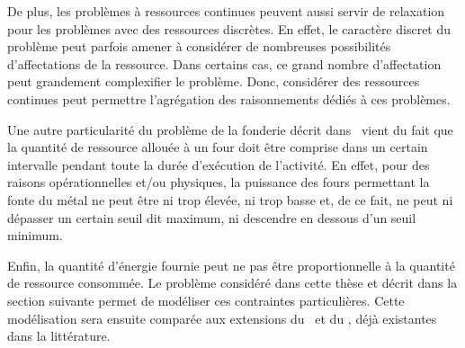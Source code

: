 De plus, les problèmes à ressources continues peuvent aussi servir de
relaxation pour les problèmes avec des ressources discrètes. En effet,
le caractère discret du problème peut parfois amener à considérer de
nombreuses possibilités d'affectations de la ressource. Dans certains
cas, ce grand nombre d'affectation peut grandement complexifier le
problème. Donc, considérer des ressources continues peut permettre
l'agrégation des raisonnements dédiés à ces problèmes.

Une autre particularité du problème de la fonderie décrit
dans~\cite{HaitArtiguesLopez} vient du fait que la quantité de
ressource allouée à un four doit être comprise dans un certain
intervalle pendant toute la durée d'exécution de l'activité.  En
effet, pour des raisons opérationnelles et/ou physiques, la puissance
des fours permettant la fonte du métal ne peut être ni trop élevée, ni
trop basse et, de ce fait, ne peut ni dépasser un certain seuil dit
maximum, ni descendre en dessous d'un seuil minimum.

Enfin, la quantité d'énergie fournie peut ne pas être
proportionnelle à la quantité de ressource consommée. Le problème
considéré dans cette thèse et décrit dans la section suivante permet
de modéliser ces contraintes particulières. Cette modélisation sera
ensuite comparée aux extensions du \CUSP~et du \RCPSP, déjà existantes
dans la littérature.

